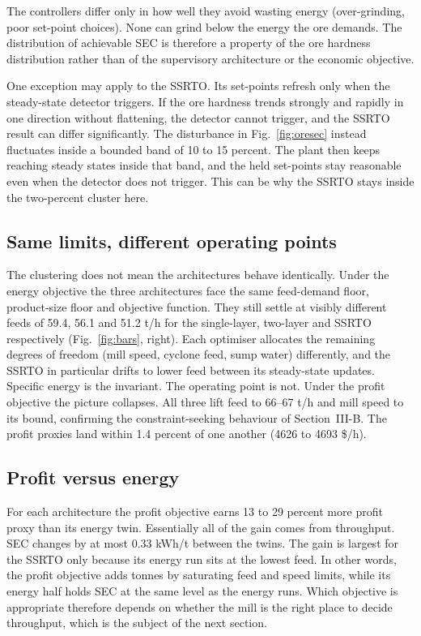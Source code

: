 \documentclass[conference]{IEEEtran}
\begin{document}
The controllers differ only in how well they avoid wasting energy
(over-grinding, poor set-point choices). None can grind below the energy
the ore demands. The distribution of achievable SEC is therefore a
property of the ore hardness distribution rather than of the supervisory
architecture or the economic objective.

One exception may apply to the SSRTO. Its set-points refresh only when
the steady-state detector triggers. If the ore hardness trends strongly
and rapidly in one direction without flattening, the detector cannot
trigger, and the SSRTO result can differ significantly. The disturbance
in Fig.~\ref{fig:oresec} instead fluctuates inside a bounded band of 10
to 15 percent.
The plant then keeps reaching steady states inside that band, and the
held set-points stay reasonable even when the detector does not
trigger. This can be why the SSRTO stays inside the two-percent cluster
here.

\subsection{Same limits, different operating points}

The clustering does not mean the architectures behave identically. Under
the energy objective the three architectures face the same feed-demand
floor, product-size floor and objective function. They still settle at
visibly different feeds of 59.4, 56.1 and 51.2 t/h for the single-layer,
two-layer and SSRTO respectively (Fig.~\ref{fig:bars}, right). Each
optimiser allocates the remaining degrees of freedom (mill speed, cyclone
feed, sump water) differently, and the SSRTO in particular drifts to
lower feed between its steady-state updates. Specific energy is the
invariant. The operating point is not. Under the profit objective the
picture collapses. All three lift feed to 66--67 t/h and mill speed to
its bound, confirming the constraint-seeking behaviour of Section~III-B.
The profit proxies land within 1.4 percent of one another (4626 to 4693
\$/h).

\subsection{Profit versus energy}

For each architecture the profit objective earns 13 to 29 percent more
profit proxy than its energy twin. Essentially all of the gain comes from
throughput. SEC changes by at most 0.33 kWh/t between the twins. The gain is largest
for the SSRTO only because its energy run sits at the lowest feed. In
other words, the profit objective adds tonnes by saturating feed and
speed limits, while its energy half holds SEC at the same level as the
energy runs. Which objective is appropriate therefore depends on whether
the mill is the right place to decide throughput, which is the subject
of the next section.
\end{document}
